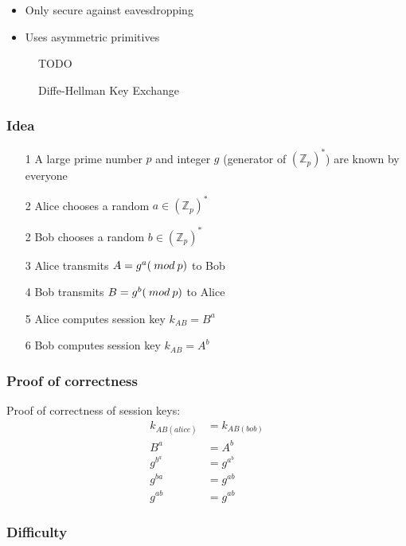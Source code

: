 \documentclass[a4paper]{article}
\begin{document}
\begin{itemize}
  \item Only secure against eavesdropping
  \item Uses asymmetric primitives
\end{itemize}

\begin{figure}[h!]
  \centering
  TODO
  \caption{Diffe-Hellman Key Exchange}
  \label{fig:diffe_hellman_key_exchange}
\end{figure}
\FloatBarrier

\subsubsection{Idea}

\begin{enumerate}
  \item[1] A large prime number $p$ and integer $g$ (generator of
           $(\mathbb{Z}_{p})^{*}$) are known by everyone
  \item[2] Alice chooses a random $a \in (\mathbb{Z}_{p})^{*}$
  \item[2] Bob chooses a random $b \in (\mathbb{Z}_{p})^{*}$
  \item[3] Alice transmits $A = g^{a} (\: mod \: p)$ to Bob
  \item[4] Bob transmits $B = g^{b} (\: mod \: p)$ to Alice
  \item[5] Alice computes session key $k_{AB} = B^{a}$
  \item[6] Bob computes session key $k_{AB} = A^{b}$
\end{enumerate}

\subsubsection{Proof of correctness}

Proof of correctness of session keys:
\begin{align*}
  k_{AB(alice)} &= k_{AB(bob)} \\
  B^{a} &= A^{b} \\
  g^{b^{a}} &= g^{a^{b}} \\
  g^{ba} &= g^{ab} \\
  g^{ab} &= g^{ab}
\end{align*}

\subsubsection{Difficulty}
\end{document}

